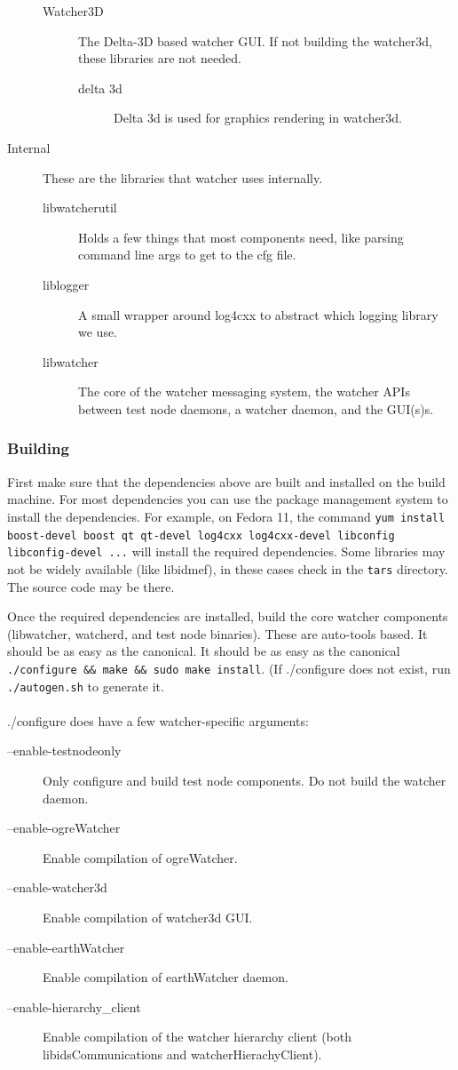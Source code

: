 \documentclass{article}
\begin{document}
\begin{description}
\begin{description}
\item[Watcher3D] The Delta-3D based watcher GUI. If not building the watcher3d, these libraries are not needed. 
\begin{description}
\item[delta 3d] Delta 3d is used for graphics rendering in watcher3d. 
\end{description}
\end{description}
\item[Internal] These are the libraries that watcher uses internally. 
\begin{description}
\item[libwatcherutil] Holds a few things that most components need, like parsing command line args to get to the cfg file.
\item[liblogger] A small wrapper around log4cxx to abstract which logging library we use. 
\item[libwatcher] The core of the watcher messaging system, the watcher APIs between test node daemons, a watcher daemon, and the GUI(s)s.
\end{description}
\end{description}

\subsubsection{Building}

First make sure that the dependencies above are built and installed on the build machine. For most dependencies you can use the package management system to install 
the dependencies. For example, on Fedora 11, the command {\tt yum install boost-devel boost qt qt-devel log4cxx log4cxx-devel libconfig libconfig-devel ...} will install the 
required dependencies. Some libraries may not be widely available (like libidmef), in these cases check in the {\tt tars} directory. The source code may be there. 

Once the required dependencies are installed, build the core watcher components (libwatcher, watcherd, and test node binaries). These are auto-tools based. It should be as easy 
as the canonical. It should be as easy as the canonical {\tt .\slash configure \&\& make \&\& sudo make install}. (If .\slash configure does not exist, run {\tt .\slash autogen.sh} to generate it. 
\\\\
.\slash configure does have a few watcher-specific arguments:
\begin{description}
\item[--enable-testnodeonly]   Only configure and build test node components. Do not build the watcher daemon.
\item[--enable-ogreWatcher]    Enable compilation of ogreWatcher.
\item[--enable-watcher3d]      Enable compilation of watcher3d GUI.
\item[--enable-earthWatcher]      Enable compilation of earthWatcher daemon.
\item[--enable-hierarchy\_client] Enable compilation of the watcher hierarchy client (both libidsCommunications and watcherHierachyClient). 
\end{description}
\end{document}
